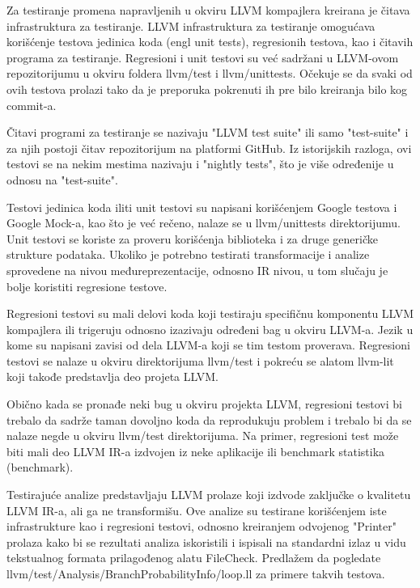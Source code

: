 \documentclass[12pt,oneside]{memoir}
\begin{document}
Za testiranje promena napravljenih u okviru LLVM kompajlera kreirana je čitava infrastruktura za 
testiranje. LLVM infrastruktura za testiranje omogućava korišćenje testova jedinica koda (engl 
unit tests), regresionih testova, kao i čitavih programa za testiranje. Regresioni i unit testovi 
su već sadržani u LLVM-ovom repozitorijumu u okviru foldera llvm/test i llvm/unittests. Očekuje 
se da svaki od ovih testova prolazi tako da je preporuka pokrenuti ih pre bilo kreiranja bilo kog 
commit-a.

Čitavi programi za testiranje se nazivaju "LLVM test suite" ili samo "test-suite" i za njih 
postoji čitav repozitorijum na platformi GitHub. Iz istorijskih razloga, ovi testovi se na nekim 
mestima nazivaju i "nightly tests", što je više određenije u odnosu na "test-suite". 

Testovi jedinica koda iliti unit testovi su napisani korišćenjem Google testova i Google Mock-a, 
kao što je već rečeno, nalaze se u llvm/unittests direktorijumu. Unit testovi se koriste za 
proveru korišćenja biblioteka i za druge generičke strukture podataka. Ukoliko je potrebno 
testirati transformacije i analize sprovedene na nivou međureprezentacije, odnosno IR nivou, u 
tom slučaju je bolje koristiti regresione testove.

Regresioni testovi su mali delovi koda koji testiraju specifičnu komponentu LLVM kompajlera ili 
trigeruju odnosno izazivaju određeni bag u okviru LLVM-a. Jezik u kome su napisani zavisi od dela 
LLVM-a koji se tim testom proverava. Regresioni testovi se nalaze u okviru direktorijuma 
llvm/test i pokreću se alatom llvm-lit koji takođe predstavlja deo projeta LLVM.

Obično kada se pronađe neki bug u okviru projekta LLVM, regresioni testovi bi trebalo da sadrže 
taman dovoljno koda da reprodukuju problem i trebalo bi da se nalaze negde u okviru llvm/test 
direktorijuma. Na primer, regresioni test može biti mali deo LLVM IR-a izdvojen iz neke 
aplikacije ili benchmark statistika (benchmark).

Testirajuće analize predstavljaju LLVM prolaze koji izdvode zaključke o kvalitetu LLVM IR-a, ali 
ga ne transformišu. Ove analize su testirane korišćenjem iste infrastrukture kao i regresioni 
testovi, odnosno kreiranjem odvojenog "Printer" prolaza kako bi se rezultati analiza iskoristili 
i ispisali na standardni izlaz u vidu tekstualnog formata prilagođenog alatu FileCheck.
Predlažem da pogledate llvm/test/Analysis/BranchProbabilityInfo/loop.ll za primere takvih testova.
\end{document}

